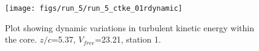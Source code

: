 \begin{figure}[H]
\centering
\texttt{[image: figs/run\_5/run\_5\_ctke\_01rdynamic]}
\caption{Plot showing dynamic variations in turbulent kinetic energy within the core. $z/c$=5.37, $V_{free}$=23.21, station 1.}
\label{fig:run_5_ctke_01rdynamic}
\end{figure}


